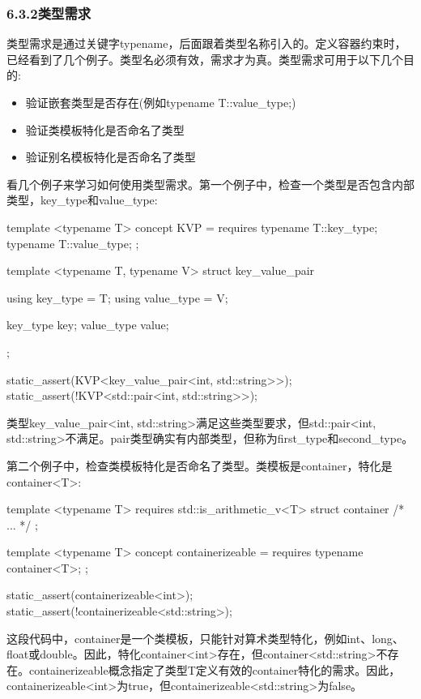 \subsubsection{6.3.2\hspace{0.2cm}类型需求}

类型需求是通过关键字typename，后面跟着类型名称引入的。定义容器约束时，已经看到了几个例子。类型名必须有效，需求才为真。类型需求可用于以下几个目的:

\begin{itemize}
\item
验证嵌套类型是否存在(例如typename T::value\_type;)

\item
验证类模板特化是否命名了类型

\item
验证别名模板特化是否命名了类型
\end{itemize}

看几个例子来学习如何使用类型需求。第一个例子中，检查一个类型是否包含内部类型，key\_type和value\_type:

\begin{cpp}
template <typename T>
concept KVP = requires
{
	typename T::key_type;
	typename T::value_type;
};

template <typename T, typename V>
struct key_value_pair
{
	using key_type = T;
	using value_type = V;
	
	key_type key;
	value_type value;
};

static_assert(KVP<key_value_pair<int, std::string>>);
static_assert(!KVP<std::pair<int, std::string>>);
\end{cpp}

类型key\_value\_pair<int, std::string>满足这些类型要求，但std::pair<int, std::string>不满足。pair类型确实有内部类型，但称为first\_type和second\_type。

第二个例子中，检查类模板特化是否命名了类型。类模板是container，特化是container<T>:

\begin{cpp}
template <typename T>
requires std::is_arithmetic_v<T>
struct container
{ /* ... */ };

template <typename T>
concept containerizeable = requires {
	typename container<T>;
};

static_assert(containerizeable<int>);
static_assert(!containerizeable<std::string>);
\end{cpp}

这段代码中，container是一个类模板，只能针对算术类型特化，例如int、long、float或double。因此，特化container<int>存在，但container<std::string>不存在。containerizeable概念指定了类型T定义有效的container特化的需求。因此，containerizeable<int>为true，但containerizeable<std::string>为false。

